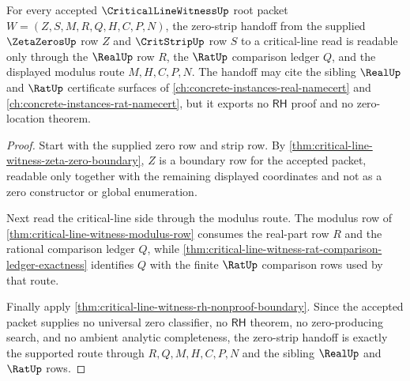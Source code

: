 \begin{theorem}
\label{thm:critical-line-witness-root-zero-strip-supported-handoff}
For every accepted $\CriticalLineWitnessUp$ root packet $W=(Z,S,M,R,Q,H,C,P,N)$, the zero-strip handoff from the supplied $\ZetaZerosUp$ row $Z$ and $\CritStripUp$ row $S$ to a critical-line read is readable only through the $\RealUp$ row $R$, the $\RatUp$ comparison ledger $Q$, and the displayed modulus route $M,H,C,P,N$. The handoff may cite the sibling $\RealUp$ and $\RatUp$ certificate surfaces of \autoref{ch:concrete-instances-real-namecert} and \autoref{ch:concrete-instances-rat-namecert}, but it exports no $\mathsf{RH}$ proof and no zero-location theorem.
\end{theorem}
\begin{proof}
Start with the supplied zero row and strip row. By \autoref{thm:critical-line-witness-zeta-zero-boundary}, $Z$ is a boundary row for the accepted packet, readable only together with the remaining displayed coordinates and not as a zero constructor or global enumeration.

Next read the critical-line side through the modulus route. The modulus row of \autoref{thm:critical-line-witness-modulus-row} consumes the real-part row $R$ and the rational comparison ledger $Q$, while \autoref{thm:critical-line-witness-rat-comparison-ledger-exactness} identifies $Q$ with the finite $\RatUp$ comparison rows used by that route.

Finally apply \autoref{thm:critical-line-witness-rh-nonproof-boundary}. Since the accepted packet supplies no universal zero classifier, no $\mathsf{RH}$ theorem, no zero-producing search, and no ambient analytic completeness, the zero-strip handoff is exactly the supported route through $R,Q,M,H,C,P,N$ and the sibling $\RealUp$ and $\RatUp$ rows.
\end{proof}


